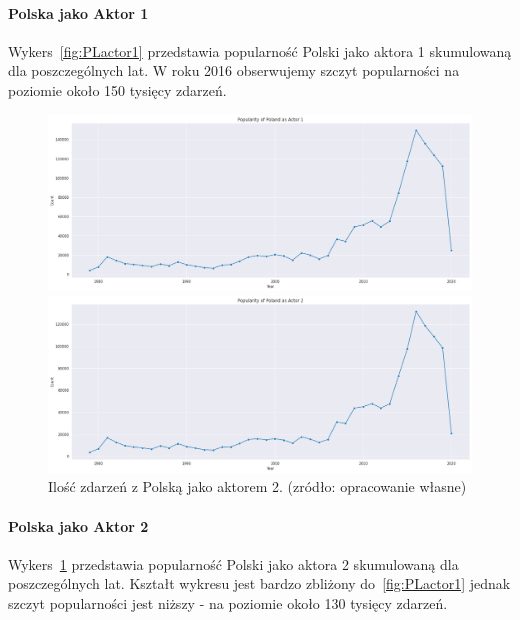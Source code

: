 \documentclass[11pt]{report}
\begin{document}
    \paragraph{Polska jako Aktor 1}
    Wykers~\ref{fig:PLactor1} przedstawia popularność Polski jako aktora 1 skumulowaną dla poszczególnych lat.
    W roku 2016 obserwujemy szczyt popularności na poziomie około 150 tysięcy zdarzeń.
    \begin{figure}[ht]
        \centering
        \includegraphics[width=1 \textwidth]{fig/PL/PLactor1.png}
        \caption{Ilość zdarzeń z Polską jako aktorem 1. (zródło: opracowanie własne)}
        \label{fig:PLactor1}
        \includegraphics[width=1 \textwidth]{fig/PL/PLactor2.png}
        \caption{Ilość zdarzeń z Polską jako aktorem 2. (zródło: opracowanie własne)}
        \label{fig:PLactor2}
    \end{figure}

    \paragraph{Polska jako Aktor 2}
    Wykers~\ref{fig:PLactor2} przedstawia popularność Polski jako aktora 2 skumulowaną dla poszczególnych lat. Kształt wykresu jest bardzo zbliżony do~\ref{fig:PLactor1} jednak szczyt popularności jest niższy - na poziomie około 130 tysięcy zdarzeń.
\end{document}
